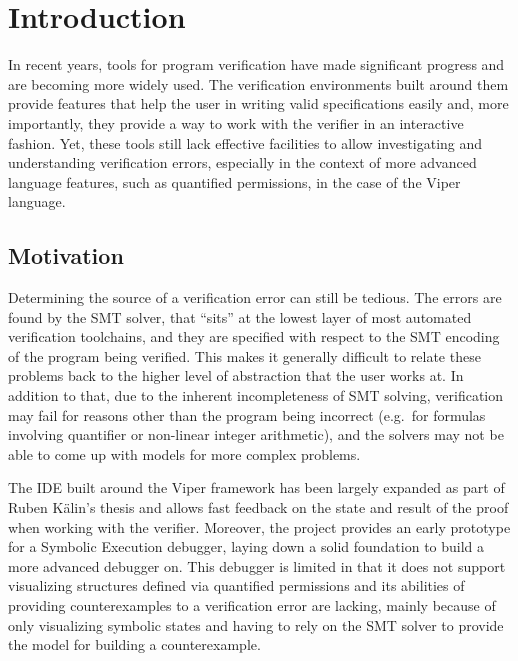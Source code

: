 \chapter{Introduction}\label{sec:introduction}

In recent years, tools for program verification have made significant progress
and are becoming more widely used. The verification environments built around
them provide features that help the user in writing valid specifications easily
and, more importantly, they provide a way to work with the verifier in an
interactive fashion. Yet, these tools still lack effective facilities to allow
investigating and understanding verification errors, especially in the context
of more advanced language features, such as quantified
permissions\cite{iterated-separating-conjunctions}, in the case
of the Viper language\citep{viper}.




\section{Motivation}\label{sec:motivation}

Determining the source of a verification error can still be tedious. The errors
are found by the SMT solver\citep{smt}, that ``sits'' at the lowest layer of
most automated verification toolchains, and they are specified with respect to
the SMT encoding of the program being verified. This makes it generally
difficult to relate these problems back to the higher level of abstraction that
the user works at.  In addition to that, due to the inherent incompleteness of
SMT solving, verification may fail for reasons other than the program being
incorrect (e.g.\ for formulas involving quantifier or non-linear integer
arithmetic), and the solvers may not be able to come up with models for more
complex problems.

The IDE built around the Viper framework \citep{viper} has been largely expanded
as part of Ruben Kälin's thesis \citep{kaelin} and allows fast feedback on the
state and result of the proof when working with the verifier. Moreover, the
project provides an early prototype for a Symbolic Execution debugger, laying
down a solid foundation to build a more advanced debugger on. This debugger is
limited in that it does not support visualizing structures defined via
quantified permissions and its abilities of providing counterexamples to
a verification error are lacking, mainly because of only visualizing symbolic
states and having to rely on the SMT solver to provide the model for building
a counterexample.

